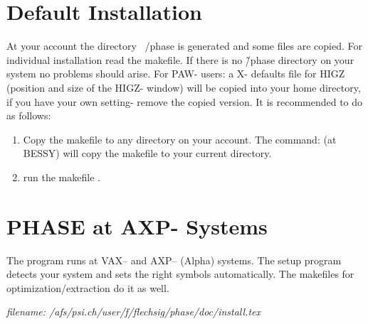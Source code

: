 \section{Default Installation}
At your account the directory ~/phase is generated and some files are
copied.  For individual installation read the makefile. If there is no
\~/phase directory on your system no problems should arise. For PAW-
users: a X- defaults file for HIGZ (position and size of the HIGZ-
window) will be copied into your home directory, if you have your own
setting- remove the copied version.  It is recommended to do as
follows:
\begin{enumerate}
	\item Copy the makefile to any directory on your account. The
   command: (at BESSY)  will
   copy the makefile to your current directory.  
	\item run the
   makefile .
\end{enumerate}



\section{PHASE at AXP- Systems}
The \phase program runs at VAX-- and AXP-- (Alpha) systems. The setup
program  detects your system and sets the right
symbols automatically. The makefiles for optimization/extraction do it
as well.

\tiny{\it filename: /afs/psi.ch/user/f/flechsig/phase/doc/install.tex}  
